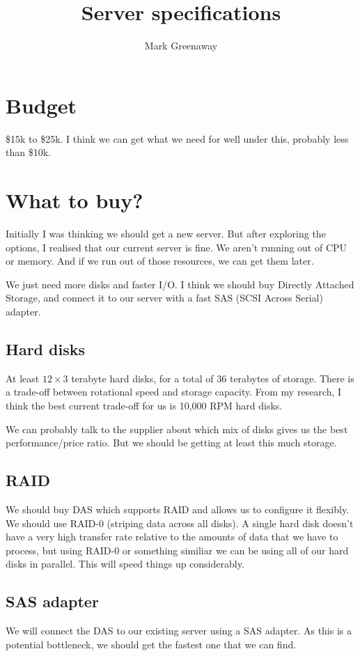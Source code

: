 \documentclass{amsart}
\author{Mark Greenaway}
\title{Server specifications}
\begin{document}
\section{Budget}
\$15k to \$25k. I think we can get what we need for well under this, probably less than \$10k.

\section{What to buy?}
Initially I was thinking we should get a new server. But after exploring the options, I
realised that our current server is fine. We aren't running out of CPU or memory. And if we
run out of those resources, we can get them later.

We just need more disks and faster I/O. I think we should buy Directly Attached Storage, and 
connect it to our server with a fast SAS (SCSI Across Serial) adapter.

\subsection{Hard disks}
At least $12 \times 3$ terabyte hard disks, for a total of 36 terabytes of storage.
There is a trade-off between rotational speed and storage capacity. From my
research, I think the best current trade-off for us is 10,000 RPM hard disks.

We can probably talk to the supplier about which mix of disks gives us the best 
performance/price ratio. But we should be getting at least this much storage.

\subsection{RAID}
We should buy DAS which supports RAID and allows us to configure it flexibly. We should use
RAID-0 (striping data across all disks). A single hard disk doesn't have a very high transfer
rate relative to the amounts of data that we have to process, but using RAID-0 or something
similiar we can be using all of our hard disks in parallel. This will speed things up 
considerably.

\subsection{SAS adapter}
We will connect the DAS to our existing server using a SAS adapter. As this is a potential
bottleneck, we should get the fastest one that we can find.
\end{document}
